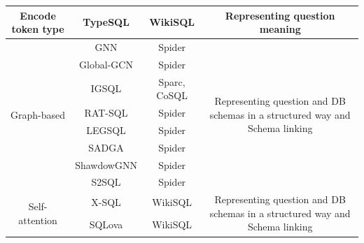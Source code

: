 \begin{table}[H]
\begin{tabular}{|c|c|c|c|}
        Encode token type               & TypeSQL             & WikiSQL                   & Representing question meaning                                                                              \\
        \hline
        \multirow{8}{*}{Graph-based}    & GNN                 & Spider                    & \multirow{8}{*}{\parbox{5cm}{Representing question and DB schemas in a structured way and Schema linking}} \\
                                        & Global-GCN          & Spider                    &                                                                                                            \\
                                        & IGSQL               & Sparc, CoSQL              &                                                                                                            \\
                                        & RAT-SQL             & Spider                    &                                                                                                            \\
                                        & LEGSQL              & Spider                    &                                                                                                            \\
                                        & SADGA               & Spider                    &                                                                                                            \\
                                        & ShawdowGNN          & Spider                    &                                                                                                            \\
                                        & S2SQL               & Spider                    &                                                                                                            \\
        \hline
        \multirow{5}{*}{Self-attention} & X-SQL               & WikiSQL                   & \multirow{5}{*}{\parbox{5cm}{Representing question and DB schemas in a structured way and Schema linking}} \\
                                        & SQLova              & WikiSQL                   &                                                                                                            \\

\end{tabular}
\end{table}
